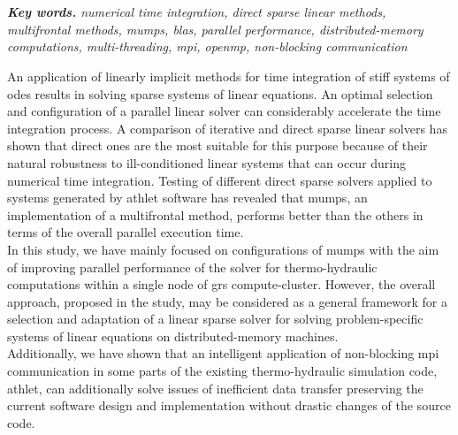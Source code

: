 \chapter{\abstractname}

\textit{\textbf{Key words.} numerical time integration, direct sparse linear methods, multifrontal methods, \acrshort{mumps}, \acrshort{blas}, parallel performance, distributed-memory computations,  multi-threading, \acrshort{mpi}, \acrshort{openmp}, non-blocking communication}

\vspace{10mm}



An application of linearly implicit methods for time integration of stiff systems of \acrshort{ode}s  results in solving sparse systems of linear equations. An optimal selection and configuration of a parallel linear solver can considerably accelerate the time integration process. A comparison of iterative and direct sparse linear solvers has shown that direct ones are the most suitable for this purpose because of their natural robustness to ill-conditioned linear systems that can occur during numerical time integration. Testing of different direct sparse solvers applied to systems generated by \acrshort{athlet} software has revealed that \acrshort{mumps}, an implementation of a multifrontal method, performs better than the others in terms of the overall parallel execution time.\\



In this study, we have mainly focused on configurations of \acrshort{mumps} with the aim of improving parallel performance of the solver for thermo-hydraulic computations within a single node of \acrshort{grs} compute-cluster. However, the overall approach,  proposed in the study, may be considered as a general framework for a selection and adaptation of a linear sparse solver for solving problem-specific systems of linear equations on distributed-memory machines.\\


Additionally, we have shown that an intelligent application of non-blocking \acrshort{mpi} communication in some parts of the existing thermo-hydraulic simulation code, \acrshort{athlet}, can additionally solve issues of inefficient data transfer preserving the current software design and implementation without drastic changes of the source code.\\
